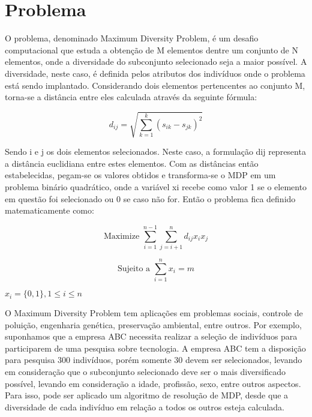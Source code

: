 \documentclass[12pt]{article}
\begin{document}
\section{Problema}

O problema, denominado Maximum Diversity Problem, é um desafio computacional que estuda a obtenção de M elementos dentre um conjunto de N elementos, onde a diversidade do subconjunto selecionado seja a maior possível. A diversidade, neste caso, é definida pelos atributos dos indivíduos onde o problema está sendo implantado. Considerando dois elementos pertencentes ao conjunto M, torna-se a distância entre eles calculada através da seguinte fórmula:

\begin{equation}
    d_{ij}=\sqrt{ \sum_{k=1}^{k} (s_{ik}-s_{jk})^{2} }
\end{equation}

Sendo i e j os dois elementos selecionados. Neste caso, a formulação dij representa a distância euclidiana entre estes elementos. Com as distâncias então estabelecidas, pegam-se os valores obtidos e transforma-se o MDP em um problema binário quadrático, onde a variável xi recebe como valor 1 se o elemento em questão foi selecionado ou 0 se caso não for. Então o problema fica definido matematicamente como:

\begin{equation}
    \text{Maximize }\sum_{i=1}^{n-1} \sum_{j=i+1}^{n} d_{ij} x_{i} x_{j}
\end{equation}

\begin{equation}
    \text{Sujeito a } \sum_{i=1}^{n} x_{i} = m
\end{equation}
\begin{center}
    $x_i=\{0,1\}, 1 \leq i \leq n$
\end{center}

O Maximum Diversity Problem tem aplicações em problemas sociais, controle de poluição, engenharia genética, preservação ambiental, entre outros. Por exemplo, suponhamos que a empresa ABC necessita realizar a seleção de indivíduos para participarem de uma pesquisa sobre tecnologia. A empresa ABC tem a disposição para pesquisa 300 indivíduos, porém somente 30 devem ser selecionados, levando em consideração que o subconjunto selecionado deve ser o mais diversificado possível, levando em consideração a idade, profissão, sexo, entre outros aspectos. Para isso, pode ser aplicado um algoritmo de resolução de MDP, desde que a diversidade de cada indivíduo em relação a todos os outros esteja calculada.
\end{document}
